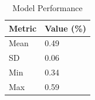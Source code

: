 \begin{table}[ht]
\centering
\caption{Model Performance}
\label{tab:performance}
\begin{tabular}{l l}
\hline
Metric & Value (\%) \\
\hline
Mean & 0.49 \\
SD & 0.06 \\
Min & 0.34 \\
Max & 0.59 \\
\hline
\end{tabular}
\end{table}
